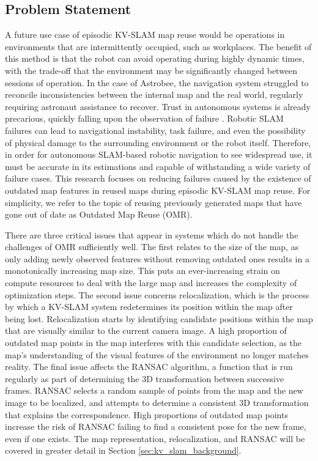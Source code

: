 \subsection{Problem Statement}

A future use case of episodic KV-SLAM map reuse would be operations in environments that are intermittently occupied, such as workplaces. The benefit of this method is that the robot can avoid operating during highly dynamic times, with the trade-off that the environment may be significantly changed between sessions of operation. In the case of Astrobee, the navigation system struggled to reconcile inconsistencies between the internal map and the real world, regularly requiring astronaut assistance to recover. Trust in autonomous systems is already precarious, quickly falling upon the observation of failure \cite{robinetteEffectRobotPerformance2017}. Robotic SLAM failures can lead to navigational instability, task failure, and even the possibility of physical damage to the surrounding environment or the robot itself\cite{nahavandiComprehensiveReviewAutonomous2025}. Therefore, in order for autonomous SLAM-based robotic navigation to see widespread use, it must be accurate in its estimations and capable of withstanding a wide variety of failure cases. This research focuses on reducing failures caused by the existence of outdated map features in reused maps during episodic KV-SLAM map reuse. For simplicity, we refer to the topic of reusing previously generated maps that have gone out of date as Outdated Map Reuse (OMR).

There are three critical issues that appear in systems which do not handle the challenges of OMR sufficiently well. The first relates to the size of the map, as only adding newly observed features without removing outdated ones results in a monotonically increasing map size. This puts an ever-increasing strain on compute resources to deal with the large map and increases the complexity of optimization steps. The second issue concerns relocalization, which is the process by which a KV-SLAM system redetermines its position within the map after being lost. Relocalization starts by identifying candidate positions within the map that are visually similar to the current camera image. A high proportion of outdated map points in the map interferes with this candidate selection, as the map's understanding of the visual features of the environment no longer matches reality. The final issue affects the RANSAC algorithm, a function that is run regularly as part of determining the 3D transformation between successive frames. RANSAC selects a random sample of points from the map and the new image to be localized, and attempts to determine a consistent 3D transformation that explains the correspondence. High proportions of outdated map points increase the risk of RANSAC failing to find a consistent pose for the new frame, even if one exists. The map representation, relocalization, and RANSAC will be covered in greater detail in Section \ref{sec:kv_slam_background}.

